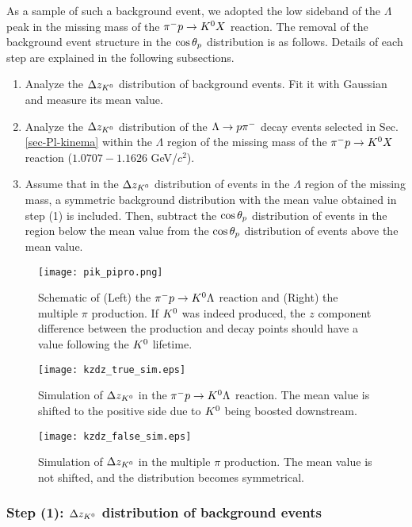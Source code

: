 As a sample of such a background event, we adopted the low sideband of the $\Lambda$ peak in the missing mass of the $\pi^- p \to K^0 X$ reaction. The removal of the background event structure in the $\cos{\theta_p}$ distribution is as follows. Details of each step are explained in the following subsections. 

\begin{enumerate}
  \item Analyze the $\Delta z_{K^{0}}$ distribution of background events. Fit it with Gaussian and measure its mean value.
  \item Analyze the $\Delta z_{K^{0}}$ distribution of the $\Lambda\to p\pi^{-}$ decay events selected in Sec. \ref{sec-Pl-kinema} within the $\Lambda$ region of the missing mass of the $\pi^- p \to K^0 X$ reaction ($1.0707-1.1626$ GeV/$c^{2}$).
  \item Assume that in the $\Delta z_{K^{0}}$ distribution of events in the $\Lambda$ region of the missing mass, a symmetric background distribution with the mean value obtained in step (1) is included. Then, subtract the $\cos{\theta_p}$ distribution of events in the region below the mean value from the $\cos{\theta_p}$ distribution of events above the mean value.
\end{enumerate}

\begin{figure}[h]
  \centering
  \texttt{[image: pik\_pipro.png]}
  \caption{Schematic of (Left) the $\pi^- p \to K^0 \Lambda$ reaction and (Right) the multiple $\pi$ production. If $K^{0}$ was indeed produced, the $z$ component difference between the production and decay points should have a value following the $K^{0}$ lifetime.}
  \label{fig-pik_pipro}
\end{figure}
 
\begin{figure}[!h]
    \centering
    \texttt{[image: kzdz\_true\_sim.eps]}
    \caption{Simulation of $\Delta z_{K^{0}}$ in the $\pi^- p \to K^0 \Lambda$ reaction. The mean value is shifted to the positive side due to $K^{0}$ being boosted downstream.}
    \label{fig-kzdz_true_sim}
\end{figure}

\begin{figure}[!h]
    \centering
    \texttt{[image: kzdz\_false\_sim.eps]}
    \caption{Simulation of $\Delta z_{K^{0}}$ in the multiple $\pi$ production. The mean value is not shifted, and the distribution becomes symmetrical.}
    \label{fig-kzdz_false_sim}
\end{figure}


\subsubsection{Step (1): $\Delta z_{K^{0}}$ distribution of background events}

